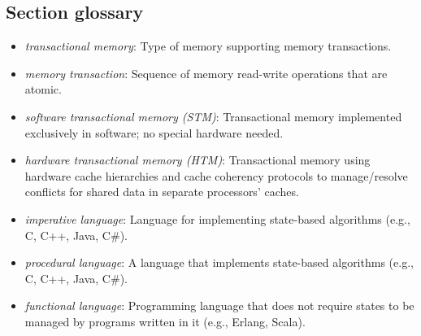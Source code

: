 \subsection{Section glossary}
\begin{itemize}
    \item \textit{transactional memory}: Type of memory supporting memory transactions.
    \item \textit{memory transaction}: Sequence of memory read-write operations that are atomic.
    \item \textit{software transactional memory (STM)}: Transactional memory implemented exclusively in software; no special hardware needed.
    \item \textit{hardware transactional memory (HTM)}: Transactional memory using hardware cache hierarchies and cache coherency protocols to manage/resolve conflicts for shared data in separate processors' caches.
    \item \textit{imperative language}: Language for implementing state-based algorithms (e.g., C, C++, Java, C\#).
    \item \textit{procedural language}: A language that implements state-based algorithms (e.g., C, C++, Java, C\#).
    \item \textit{functional language}: Programming language that does not require states to be managed by programs written in it (e.g., Erlang, Scala).
\end{itemize}
